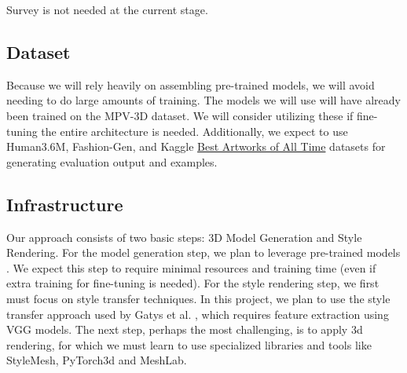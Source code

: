 \documentclass{article}
\begin{document}
Survey is not needed at the current stage.

\subsection{Dataset}
Because we will rely heavily on assembling pre-trained models, we will avoid needing to do large amounts of training. The models we will use will have already been trained on the MPV-3D dataset\cite{dong2019data1}. We will consider utilizing these if fine-tuning the entire architecture is needed. Additionally, we expect to use Human3.6M\cite{Ionescu2014pose}, Fashion-Gen\cite{rost2018fashiongen}, and Kaggle \href{https://www.kaggle.com/datasets/ikarus777/best-artworks-of-all-time}{Best Artworks of All Time} datasets for generating evaluation output and examples.

\subsection{Infrastructure}
Our approach consists of two basic steps: 3D Model Generation and Style Rendering. For the model generation step, we plan to leverage pre-trained models \cite{m3dvton}. We expect this step to require minimal resources and training time (even if extra training for fine-tuning is needed). For the style rendering step, we first must focus on style transfer techniques. In this project, we plan to use the style transfer approach used by Gatys et al. \cite{gatys2016styleTransfer}, which requires feature extraction using VGG models. The next step, perhaps the most challenging, is to apply 3d rendering, for which we must learn to use specialized libraries and tools like StyleMesh, PyTorch3d and MeshLab. 
\end{document}
